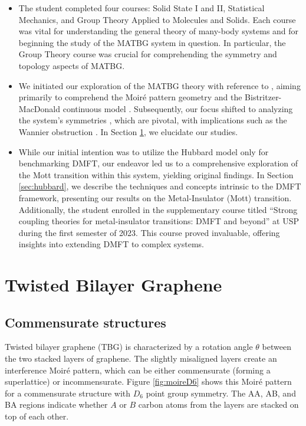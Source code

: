 \documentclass[12pt]{report}
\begin{document}
\begin{itemize}
\item The student completed four courses: Solid State I and II, Statistical Mechanics, and Group Theory Applied to Molecules and Solids. Each course was vital for understanding the general theory of many-body systems and for beginning the study of the MATBG system in question. In particular, the Group Theory course was crucial for comprehending the symmetry and topology aspects of MATBG.

\item We initiated our exploration of the MATBG theory with reference to \cite{handbook2019}, aiming primarily to comprehend the Moiré pattern geometry and the Bistritzer-MacDonald continuous model \cite{macdonald2011}. Subsequently, our focus shifted to analyzing the system's symmetries \cite{thesis_rennella}, which are pivotal, with implications such as the Wannier obstruction \cite{zou2018}. In Section \ref{sec:tbg}, we elucidate our studies.

\item While our initial intention was to utilize the Hubbard model only for benchmarking DMFT, our endeavor led us to a comprehensive exploration of the Mott transition within this system, yielding original findings. In Section \ref{sec:hubbard}, we describe the techniques and concepts intrinsic to the DMFT framework, presenting our results on the Metal-Insulator (Mott) transition. Additionally, the student enrolled in the supplementary course titled ``Strong coupling theories for metal-insulator transitions: DMFT and beyond'' at USP during the first semester of 2023. This course proved invaluable, offering insights into extending DMFT to complex systems.
\end{itemize}


\section{Twisted Bilayer Graphene} \label{sec:tbg}

\subsection{Commensurate structures} \label{sec:tbg_geom}

Twisted bilayer graphene (TBG) is characterized by a rotation angle $\theta$ between the two stacked layers of graphene. The slightly misaligned layers create an interference Moiré pattern, which can be either commensurate (forming a superlattice) or incommensurate. Figure \ref{fig:moireD6} shows this Moiré pattern for a commensurate structure with $D_6$ point group symmetry. The AA, AB, and BA regions indicate whether $A$ or $B$ carbon atoms from the layers are stacked on top of each other.
\end{document}
